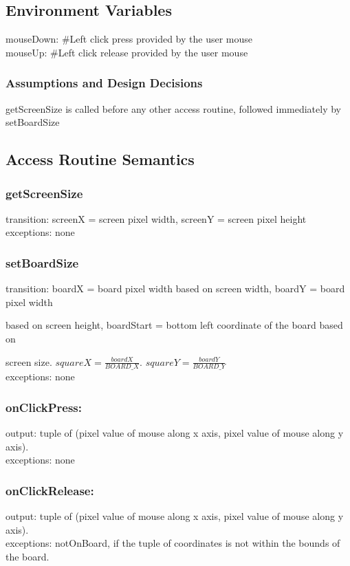 \documentclass[12pt, titlepage]{article}
\begin{document}
    \subsection*{Environment Variables}
        mouseDown: \#Left click press provided by the user mouse\\
        mouseUp: \#Left click release provided by the user mouse\\
        
        \subsubsection*{Assumptions and Design Decisions}
            getScreenSize is called before any other access routine, followed immediately by setBoardSize
            
    \subsection*{Access Routine Semantics}
        \subsubsection*{getScreenSize} 
            transition: screenX = screen pixel width, screenY = screen pixel height \\
            exceptions: none
        
        \subsubsection*{setBoardSize} 
            transition: boardX = board pixel width based on screen width, boardY = board pixel width
            
            based on screen height, boardStart = bottom left coordinate of the board based on 
            
            screen size. $squareX = \frac{boardX}{BOARD\_X}$. $squareY = \frac{boardY}{BOARD\_Y}$ \\
            exceptions: none
                
        \subsubsection*{onClickPress:} 
            output: tuple of (pixel value of mouse along x axis, pixel value of mouse along y axis). \\
            exceptions: none
        
        \subsubsection*{onClickRelease:} 
            output: tuple of (pixel value of mouse along x axis, pixel value of mouse along y axis). \\
            exceptions: notOnBoard, if the tuple of coordinates is not within the bounds of the board. 
            
\end{document}
